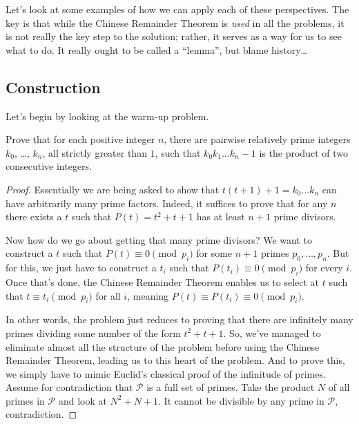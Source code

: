 \documentclass[11pt]{scrartcl}
\begin{document}
Let's look at some examples of how we can apply each of these perspectives.
The key is that while the Chinese Remainder Theorem is \emph{used} in all the problems,
it is not really the key step to the solution;
rather, it serves as a way for us to see what to do.
It really ought to be called a ``lemma'', but blame history\dots

\subsection{Construction}
Let's begin by looking at the warm-up problem.

\begin{example}
  [USAMO 2008/1]
  Prove that for each positive integer $n$,
  there are pairwise relatively prime integers $k_0$, \dots, $k_n$,
  all strictly greater than $1$, such that
  $k_0k_1 \dots k_n - 1$ is the product of two consecutive integers.
\end{example}
\begin{proof}
  Essentially we are being asked to show that $t(t+1)+1 = k_0 \dots k_n$
  can have arbitrarily many prime factors.
  Indeed, it suffices to prove that for any $n$ there exists a $t$
  such that $P(t) = t^2+t+1$ has at least $n+1$ prime divisors.

  Now how do we go about getting that many prime divisors?
  We want to construct a $t$ such that $P(t) \equiv 0 \pmod{p_i}$ for
  some $n+1$ primes $p_0, \dots, p_n$.
  But for this, we just have to construct a $t_i$
  such that $P(t_i) \equiv 0 \pmod{p_i}$ for every $i$.
  Once that's done, the Chinese Remainder Theorem
  enables us to select at $t$ such that $t \equiv t_i \pmod{p_i}$ for all $i$,
  meaning $P(t) \equiv P(t_i) \equiv 0 \pmod{p_i}$.

  In other words, the problem just reduces to proving that
  there are infinitely many primes dividing some number of the form
  $t^2+t+1$.
  So, we've managed to eliminate almost all the structure of the problem before using the Chinese Remainder Theorem, leading us to this heart of the problem.
  And to prove this, we simply have to mimic Euclid's classical proof of the infinitude of primes.
  Assume for contradiction that $\mathcal P$ is a full set of primes.
  Take the product $N$ of all primes in $\mathcal P$ and look at $N^2+N+1$.
  It cannot be divisible by any prime in $\mathcal P$, contradiction.
\end{proof}
\end{document}
